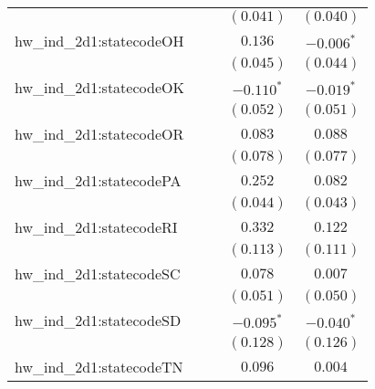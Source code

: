 \begin{center}
\begin{longtable}{l c c c c}
                         &                       &                       & $(0.041)$             & $(0.040)$             \\
hw\_ind\_2d1:statecodeOH &                       &                       & $0.136$               & $\mathbf{-0.006}^{*}$ \\
                         &                       &                       & $(0.045)$             & $(0.044)$             \\
hw\_ind\_2d1:statecodeOK &                       &                       & $\mathbf{-0.110}^{*}$ & $\mathbf{-0.019}^{*}$ \\
                         &                       &                       & $(0.052)$             & $(0.051)$             \\
hw\_ind\_2d1:statecodeOR &                       &                       & $0.083$               & $0.088$               \\
                         &                       &                       & $(0.078)$             & $(0.077)$             \\
hw\_ind\_2d1:statecodePA &                       &                       & $0.252$               & $0.082$               \\
                         &                       &                       & $(0.044)$             & $(0.043)$             \\
hw\_ind\_2d1:statecodeRI &                       &                       & $0.332$               & $0.122$               \\
                         &                       &                       & $(0.113)$             & $(0.111)$             \\
hw\_ind\_2d1:statecodeSC &                       &                       & $0.078$               & $0.007$               \\
                         &                       &                       & $(0.051)$             & $(0.050)$             \\
hw\_ind\_2d1:statecodeSD &                       &                       & $\mathbf{-0.095}^{*}$ & $\mathbf{-0.040}^{*}$ \\
                         &                       &                       & $(0.128)$             & $(0.126)$             \\
hw\_ind\_2d1:statecodeTN &                       &                       & $0.096$               & $0.004$               \\

\end{longtable}
\end{center}
